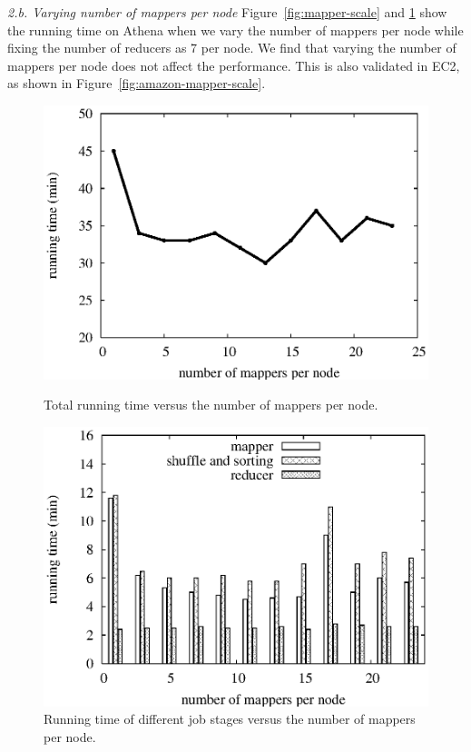 \smallskip
\textit{2.b. Varying number of mappers per node}
Figure~\ref{fig:mapper-scale} and \ref{fig:mapper-scale-timeslice} show the
running time on Athena when we vary the number of mappers per node while fixing
the number of reducers as 7 per node. We find that varying the number of mappers
per node does not affect the performance. This is also validated in EC2, as
shown in Figure~\ref{fig:amazon-mapper-scale}.

\begin{figure}[htbp]
\hfill
\begin{minipage}[t]{0.45\linewidth}
\begin{center}
\centerline{\includegraphics[scale=0.35]{plots/mapper-scale.eps}}
\caption{Total running time versus the number of mappers per node.}
\label{fig:mapper-scale}
\end{center}
\end{minipage}
\hfill
\begin{minipage}[t]{0.45\linewidth}
\begin{center}
\centerline{\includegraphics[scale=0.35]{plots/mapper-scale-timeslice.eps}}
\caption{Running time of different job stages versus the number of mappers per node.}
\label{fig:mapper-scale-timeslice}
\end{center}
\end{minipage}
\hfill
\end{figure}

